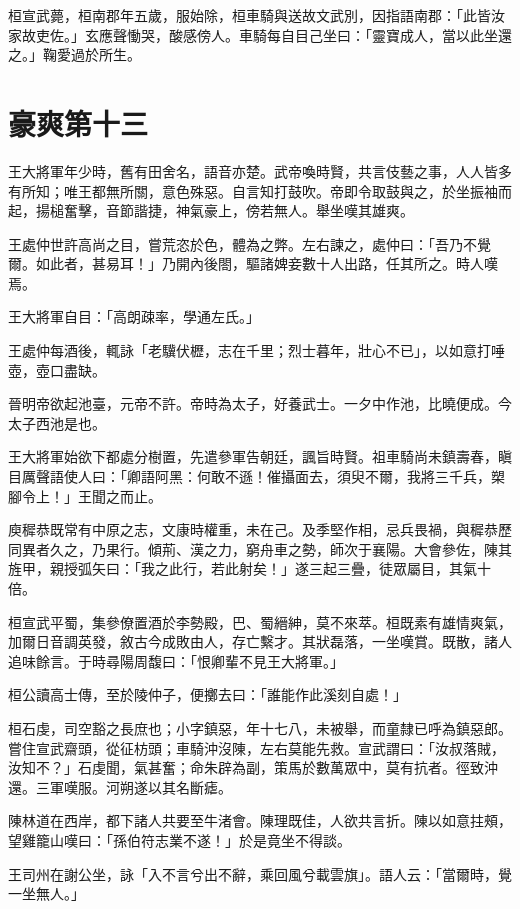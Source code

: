 桓宣武薨，桓南郡年五歲，服始除，桓車騎與送故文武別，因指語南郡：「此皆汝家故吏佐。」玄應聲慟哭，酸感傍人。車騎每自目己坐曰：「靈寶成人，當以此坐還之。」鞠愛過於所生。



\chapter{豪爽第十三}

王大將軍年少時，舊有田舍名，語音亦楚。武帝喚時賢，共言伎藝之事，人人皆多有所知；唯王都無所關，意色殊惡。自言知打鼓吹。帝即令取鼓與之，於坐振袖而起，揚槌奮擊，音節諧捷，神氣豪上，傍若無人。舉坐嘆其雄爽。

王處仲世許高尚之目，嘗荒恣於色，體為之弊。左右諫之，處仲曰：「吾乃不覺爾。如此者，甚易耳！」乃開內後閤，驅諸婢妾數十人出路，任其所之。時人嘆焉。

王大將軍自目：「高朗疎率，學通左氏。」

王處仲每酒後，輒詠「老驥伏櫪，志在千里；烈士暮年，壯心不已」，以如意打唾壺，壺口盡缺。

晉明帝欲起池臺，元帝不許。帝時為太子，好養武士。一夕中作池，比曉便成。今太子西池是也。

王大將軍始欲下都處分樹置，先遣參軍告朝廷，諷旨時賢。祖車騎尚未鎮壽春，瞋目厲聲語使人曰：「卿語阿黑：何敢不遜！催攝面去，須臾不爾，我將三千兵，槊腳令上！」王聞之而止。

庾穉恭既常有中原之志，文康時權重，未在己。及季堅作相，忌兵畏禍，與穉恭歷同異者久之，乃果行。傾荊、漢之力，窮舟車之勢，師次于襄陽。大會參佐，陳其旌甲，親授弧矢曰：「我之此行，若此射矣！」遂三起三疊，徒眾屬目，其氣十倍。

桓宣武平蜀，集參僚置酒於李勢殿，巴、蜀縉紳，莫不來萃。桓既素有雄情爽氣，加爾日音調英發，敘古今成敗由人，存亡繫才。其狀磊落，一坐嘆賞。既散，諸人追味餘言。于時尋陽周馥曰：「恨卿輩不見王大將軍。」

桓公讀高士傳，至於陵仲子，便擲去曰：「誰能作此溪刻自處！」

桓石虔，司空豁之長庶也；小字鎮惡，年十七八，未被舉，而童隸已呼為鎮惡郎。嘗住宣武齋頭，從征枋頭；車騎沖沒陳，左右莫能先救。宣武謂曰：「汝叔落賊，汝知不？」石虔聞，氣甚奮；命朱辟為副，策馬於數萬眾中，莫有抗者。徑致沖還。三軍嘆服。河朔遂以其名斷瘧。

陳林道在西岸，都下諸人共要至牛渚會。陳理既佳，人欲共言折。陳以如意拄頰，望雞籠山嘆曰：「孫伯符志業不遂！」於是竟坐不得談。

王司州在謝公坐，詠「入不言兮出不辭，乘回風兮載雲旗」。語人云：「當爾時，覺一坐無人。」

